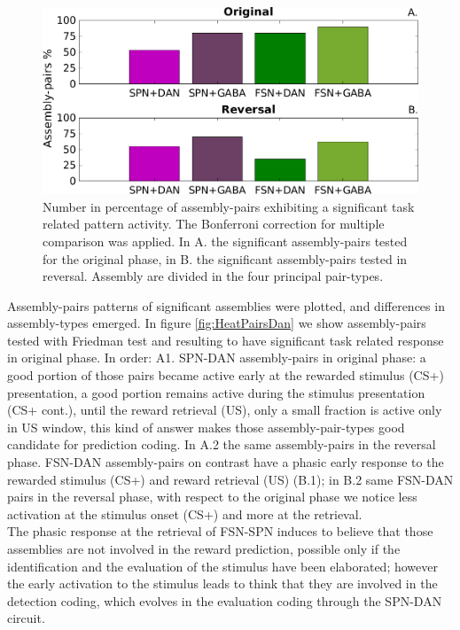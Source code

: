 \begin{figure}
    \centering
    \includegraphics[scale=0.55]{figures/PercFriedHitTrialsBFf.png}
    \caption{Number in percentage of assembly-pairs exhibiting a significant task related pattern activity. The Bonferroni correction for multiple comparison was applied. In A. the significant assembly-pairs tested for the original phase, in B. the significant assembly-pairs tested in reversal. Assembly are divided in the four principal pair-types.}
    \label{fig:PercAsFried}
\end{figure}
Assembly-pairs patterns of significant assemblies were plotted, and differences in assembly-types emerged. In figure \ref{fig:HeatPairsDan} we show assembly-pairs tested with Friedman test and resulting to have significant task related response in original phase. In order: A1. SPN-DAN assembly-pairs in original phase: a good portion of those pairs became active early at the rewarded stimulus (CS+) presentation, a good portion remains active during the stimulus presentation (CS+ cont.), until the reward retrieval (US), only a small fraction is active only in US window, this kind of answer makes those assembly-pair-types good candidate for prediction coding. In A.2 the same assembly-pairs in the reversal phase. FSN-DAN assembly-pairs on contrast have a phasic early response to the rewarded stimulus (CS+) and reward retrieval (US) (B.1); in B.2 same FSN-DAN pairs in the reversal phase, with respect to the original phase we notice less activation at the stimulus onset (CS+) and more at the retrieval.\\The phasic response at the retrieval of FSN-SPN induces to believe that those assemblies are not involved in the reward prediction, possible only if the identification and the evaluation of the stimulus have been elaborated; however the early activation to the stimulus leads to think that they are involved in the detection coding, which evolves in the evaluation coding through the SPN-DAN circuit.
